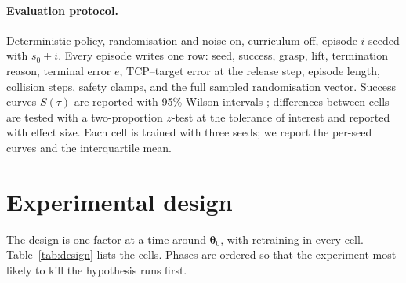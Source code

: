 \documentclass{article}
\newcommand{\iface}{\boldsymbol{\theta}}
\begin{document}
\paragraph{Evaluation protocol.}
Deterministic policy, randomisation and noise on, curriculum off, episode $i$ seeded with $s_0+i$. Every episode writes one row: seed, success, grasp, lift, termination reason, terminal error $e$, TCP--target error at the release step, episode length, collision steps, safety clamps, and the full sampled randomisation vector. Success curves $S(\tau)$ are reported with 95\% Wilson intervals \citep{wilson1927probable}; differences between cells are tested with a two-proportion $z$-test at the tolerance of interest and reported with effect size. Each cell is trained with three seeds; we report the per-seed curves and the interquartile mean.

\section{Experimental design}
\label{sec:design}

The design is one-factor-at-a-time around $\iface_0$, with retraining in every cell. Table~\ref{tab:design} lists the cells. Phases are ordered so that the experiment most likely to kill the hypothesis runs first.
\end{document}
